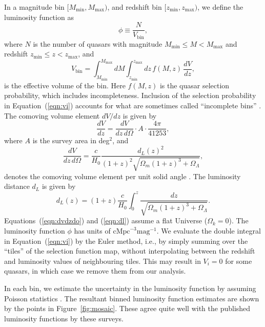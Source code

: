 \documentclass[a4paper,fleqn,usenatbib]{mnras}
\begin{document}
In a magnitude bin $[M_\mathrm{min}, M_\mathrm{max})$, and redshift
  bin $[z_\mathrm{min}, z_\mathrm{max})$, we define the luminosity
    function as \citep{2000MNRAS.311..433P}
  \begin{equation}
    \phi \equiv \frac{N}{V_\mathrm{bin}},
  \end{equation}
  where $N$ is the number of quasars with magnitude
  $M_\mathrm{min}\leq M<M_\mathrm{max}$ and redshift
  $z_\mathrm{min}\leq z<z_\mathrm{max}$, and
  \begin{equation}
    V_\mathrm{bin} = \int_{M_\mathrm{min}}^{M_\mathrm{max}}dM\int_{z_\mathrm{min}}^{z_\mathrm{max}}dz\, f(M, z)\,\frac{dV}{dz},
    \label{eqn:vi}
  \end{equation}
  is the effective volume of the bin.  Here $f(M,z)$ is the quasar
  selection probability, which includes incompleteness.  Inclusion of
  the selection probability in Equation~(\ref{eqn:vi}) accounts for
  what are sometimes called ``incomplete bins''
  \citep{2006AJ....131.2766R}.  The comoving volume element $dV/dz$ is
  given by
  \begin{equation}
    \frac{dV}{dz}=\frac{dV}{dz\,d\Omega}\cdot A\cdot\frac{4\pi}{41253},
  \end{equation}
  where $A$ is the survey area in deg$^2$, and 
  \begin{equation}
    \frac{dV}{dz\,d\Omega}=\frac{c}{H_0}\frac{d_L(z)^2}{(1+z)^2\sqrt{\Omega_m(1+z)^3+\Omega_\Lambda}},
    \label{eqn:dvdzdo}
  \end{equation}
  denotes the comoving volume element per unit solid angle
  \citep{1999astro.ph..5116H}.  The luminosity distance $d_L$ is given
  by
  \begin{equation}
    d_L(z)=(1+z)\frac{c}{H_0}\int_0^z\frac{dz}{\sqrt{\Omega_m(1+z)^3+\Omega_\Lambda}}.
    \label{eqn:dl}
  \end{equation}
  Equations~(\ref{eqn:dvdzdo}) and (\ref{eqn:dl}) assume a flat
  Universe ($\Omega_k=0$).  The luminosity function $\phi$ has units
  of $\mathrm{cMpc}^{-3}\mathrm{mag}^{-1}$.  We evaluate the double
  integral in Equation~(\ref{eqn:vi}) by the Euler method, i.e., by
  simply summing over the ``tiles'' of the selection function map,
  without interpolating between the redshift and luminosity values of
  neighbouring tiles.  This may result in $V_i=0$ for some quasars, in
  which case we remove them from our analysis.

  In each bin, we estimate the uncertainty in the luminosity function
  by assuming Poisson statistics \citep{1986ApJ...303..336G}.  The
  resultant binned luminosity function estimates are shown by the
  points in Figure~\ref{fig:mosaic}.  These agree quite well with the
  published luminosity functions by these surveys.
\end{document}
